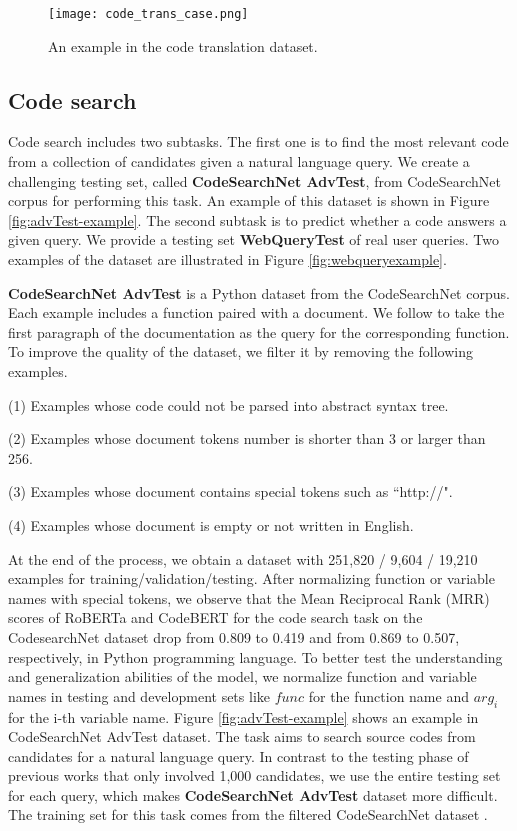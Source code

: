 \documentclass[sigconf,nonacm,screen]{acmart}
\begin{document}
\begin{figure}
    \texttt{[image: code\_trans\_case.png]}
    \caption{An example in the code translation dataset.}
    \label{fig:codetrans-example}
\end{figure}

\subsection{Code search}
\label{code_search}
Code search includes two subtasks. The first one is to find the most relevant code from a collection of candidates given a natural language query. We create a challenging testing set, called \textbf{CodeSearchNet AdvTest}, from CodeSearchNet corpus \cite{husain2019codesearchnet} for performing this task. An example of this dataset is shown in Figure \ref{fig:advTest-example}. The second subtask is to predict whether a code answers a given query.  We provide a testing set \textbf{WebQueryTest} of real user queries. Two examples of the dataset are illustrated in Figure \ref{fig:webqueryexample}.

\textbf{CodeSearchNet AdvTest} is a Python dataset from the CodeSearchNet \cite{husain2019codesearchnet} corpus. Each example includes a function paired with a document. We follow \citet{husain2019codesearchnet} to take the first paragraph of the documentation as the query for the corresponding function. To improve the quality of the dataset, we filter it by removing the following examples. 

(1) Examples whose code could not be parsed into abstract syntax tree.

(2) Examples whose document tokens number is  shorter than 3 or larger than 256.

(3) Examples whose document contains special tokens such as ``http://".

(4) Examples whose document is empty or not written in English.

At the end of the process, we obtain a dataset with 251,820 / 9,604 / 19,210 examples for training/validation/testing. 
After normalizing function or variable names with special tokens, we observe that the Mean Reciprocal Rank (MRR) scores of RoBERTa \cite{liu2019roberta} and CodeBERT \cite{feng2020codebert} for the code search task on the CodesearchNet \cite{husain2019codesearchnet} dataset drop from 0.809 to 0.419 and from 0.869 to 0.507, respectively, in Python programming language.
To better test the understanding and generalization abilities of the model, we normalize function and variable names in testing and development sets like $func$ for the function name and $arg_i$ for the i-th variable name.
Figure \ref{fig:advTest-example} shows an example in CodeSearchNet AdvTest dataset.
The task aims to search source codes from candidates for a natural language query. 
In contrast to the testing phase of previous works \cite{husain2019codesearchnet,feng2020codebert} that only involved 1,000 candidates, we use the entire testing set for each query, which makes \textbf{CodeSearchNet AdvTest} dataset more difficult. The training set for this task comes from the filtered CodeSearchNet dataset \cite{husain2019codesearchnet}.
\end{document}
